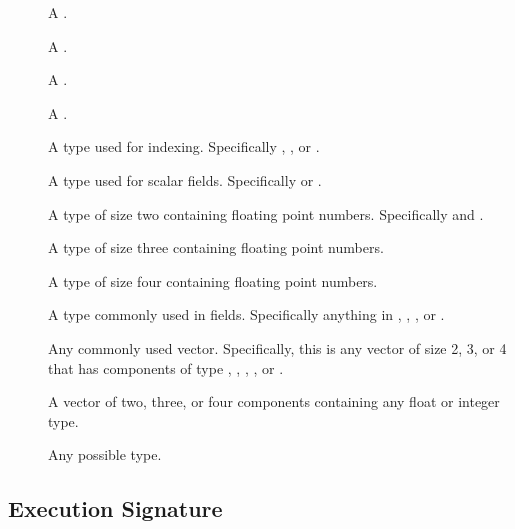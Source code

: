 \begin{description}
\item[] A .
\item[] A .
\item[] A .
\item[] A .
\item[] A type used for indexing. Specifically ,
  , or .
\item[] A type used for scalar fields. Specifically
   or .
\item[] A  type of size two containing floating
  point numbers. Specifically
  \textcode{<} and
  \textcode{<}.
\item[] A  type of size three containing floating
  point numbers.
\item[] A  type of size four containing floating
  point numbers.
\item[] A type commonly used in fields. Specifically
  anything in , , , or
  .
\item[] Any commonly used vector. Specifically, this is
  any vector of size 2, 3, or 4 that has components of type ,
  , , , or .
\item[] A vector of two, three, or four components
  containing any float or integer type.
\item[] Any possible type.
\end{description}



\subsection{Execution Signature}
\label{sec:ExecutionSignature}


